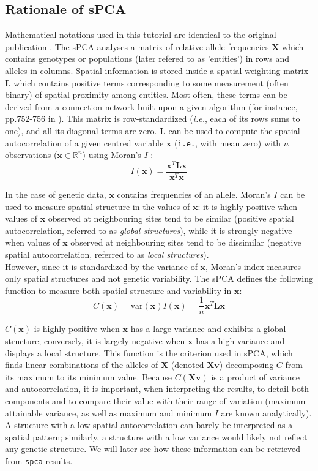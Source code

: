 \documentclass{article}
\newcommand{\R}{\mathbb{R}}
\newcommand{\beq}{\begin{equation}}
\newcommand{\eeq}{\end{equation}}
\newcommand{\m}[1]{\mathbf{#1}}
\begin{document}
\subsection{Rationale of sPCA}
Mathematical notations used in this tutorial are identical to the original publication \cite{tjart04}.
The sPCA analyses a matrix of relative allele frequencies $\m{X}$ which contains genotypes or
populations (later refered to as 'entities') in rows and alleles in columns.
Spatial information is stored inside a spatial weighting matrix
$\m{L}$ which contains positive terms corresponding to some measurement
(often binary) of spatial proximity among entities.
Most often, these terms can be derived from a connection network built
upon a given algorithm (for instance, pp.752-756 in \cite{tj88}).
This matrix is row-standardized (\textit{i.e.}, each of its rows sums
to one), and all its diagonal terms are zero.
$\m{L}$ can be used to compute the spatial autocorrelation of a
given centred variable $\m{x}$ (\texttt{i.e.}, with mean zero) with $n$ observations ($\m{x} \in
\R^n$) using Moran's $I$ \cite{tj223,tj222,tj436}:
\beq
I(\m{x}) = \frac{\m{x}^T\m{Lx}}{\m{x}^T\m{x}}
\label{eqn:I}
\eeq

In the case of genetic data, $\m{x}$ contains frequencies of an allele.
Moran's $I$ can be used to measure spatial structure in the values
of $\m{x}$: it is highly positive when values of $\m{x}$ observed at
neighbouring sites tend to be similar (positive spatial
autocorrelation, referred to as \emph{global structures}), while it is
strongly negative when values of $\m{x}$ observed at
neighbouring sites tend to be dissimilar (negative spatial
autocorrelation, referred to as \emph{local structures}).
\\


However, since it is standardized by the variance of
$\m{x}$, Moran's index measures only spatial structures and not genetic variability.
The sPCA defines the following function to measure both spatial
structure and variability in $\m{x}$:
\beq
C(\m{x}) = \mbox{var}(\m{x})I(\m{x}) = \frac{1}{n}\m{x}^T\m{Lx}
\label{eqn:C}
\eeq

$C(\m{x})$ is highly positive when $\m{x}$ has a large variance and
exhibits a global structure; conversely, it is largely negative
when $\m{x}$ has a high variance and displays a local structure.
This function is the criterion used in sPCA, which finds linear
combinations of the alleles of $\m{X}$ (denoted $\m{Xv}$) decomposing $C$ from its
maximum to its minimum value.
Because $C(\m{Xv})$ is a product of variance and autocorrelation,
it is important, when interpreting the results, to detail both
components and to compare their value with their range of variation
(maximum attainable variance, as well as maximum and minimum $I$ are
known analytically).
A structure with a low spatial autocorrelation can barely be
interpreted as a spatial pattern; similarly, a structure with a low
variance would likely not reflect any genetic structure.
We will later see how these information can be retrieved from \texttt{spca} results.
\end{document}

